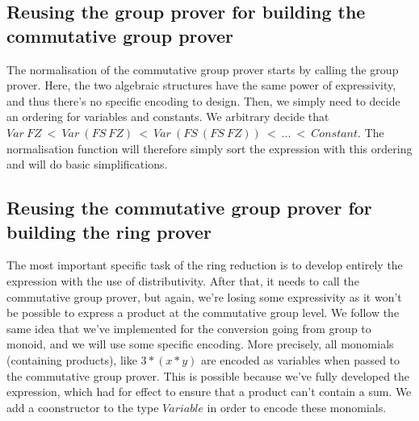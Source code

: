 \subsection {Reusing the group prover for building the commutative group prover}

The normalisation of the commutative group prover starts by calling the group prover. Here, the two algebraic structures have the same power of expressivity, and thus there's no specific encoding to design. Then, we simply need to decide an ordering for variables and constants. We arbitrary decide that $Var\ FZ\ <\ Var\ (FS\ FZ)\ <\ Var\ (FS\ (FS\ FZ))\ <\ ...\ <\ Constant$. The normalisation function will therefore simply sort the expression with this ordering and will do basic simplifications.



\subsection {Reusing the commutative group prover for building the ring prover}

The most important specific task of the ring reduction is to develop entirely the expression with the use of distributivity. After that, it needs to call the commutative group prover, but again, we're losing some expressivity as it won't be possible to express a product at the commutative group level. We follow the same idea that we've implemented for the conversion going from group to monoid, and we will use some specific encoding. More precisely, all monomials (containing products), like $3*(x*y)$ are encoded as variables when passed to the commutative group prover. This is possible because we've fully developed the expression, which had for effect to ensure that a product can't contain a sum.
We add a coonstructor to the type $Variable$ in order to encode these monomials.



